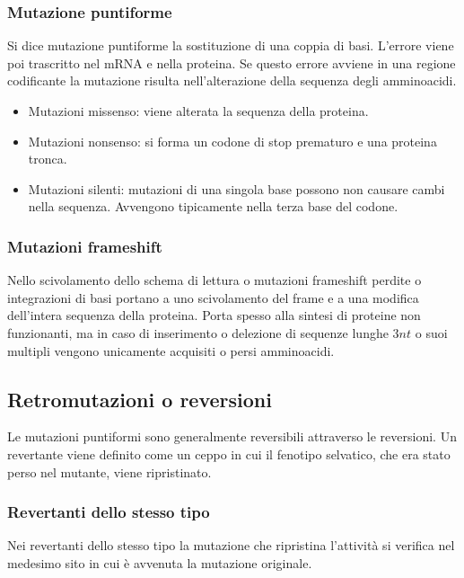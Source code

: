 		\subsubsection{Mutazione puntiforme}
		Si dice mutazione puntiforme la sostituzione di una coppia di basi.
		L'errore viene poi trascritto nel mRNA e nella proteina.
		Se questo errore avviene in una regione codificante la mutazione risulta nell'alterazione della sequenza degli amminoacidi.
		\begin{multicols}{2}
			\begin{itemize}
				\item Mutazioni missenso: viene alterata la sequenza della proteina.
				\item Mutazioni nonsenso: si forma un codone di stop prematuro e una proteina tronca.
				\item Mutazioni silenti: mutazioni di una singola base possono non causare cambi nella sequenza.
					Avvengono tipicamente nella terza base del codone.
			\end{itemize}
		\end{multicols}
	
		\subsubsection{Mutazioni frameshift}
		Nello scivolamento dello schema di lettura o mutazioni frameshift perdite o integrazioni di basi portano a uno scivolamento del frame e a una modifica dell'intera sequenza della proteina.
		Porta spesso alla sintesi di proteine non funzionanti, ma in caso di inserimento o delezione di sequenze lunghe $3nt$ o suoi multipli vengono unicamente acquisiti o persi amminoacidi.
	
	\subsection{Retromutazioni o reversioni}
	Le mutazioni puntiformi sono generalmente reversibili attraverso le reversioni. 
	Un revertante viene definito come un ceppo in cui il fenotipo selvatico, che era stato perso nel mutante, viene ripristinato. 

		\subsubsection{Revertanti dello stesso tipo}
		Nei revertanti dello stesso tipo la mutazione che ripristina l'attivit\`a si verifica nel medesimo sito in cui \`e avvenuta la mutazione originale.

